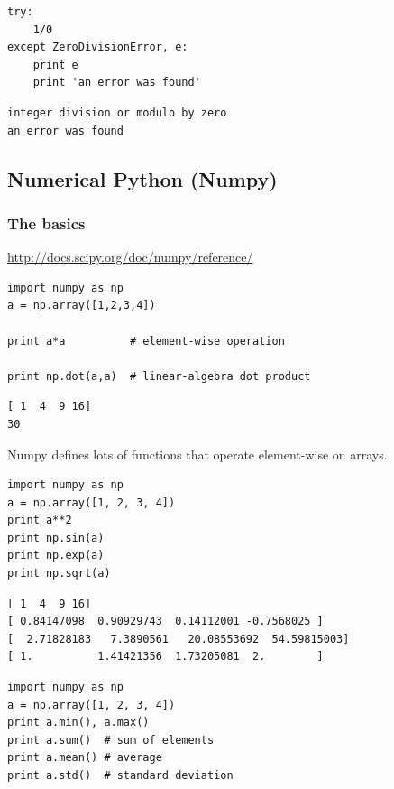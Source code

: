 \documentclass[11pt]{article}
\begin{document}
\begin{verbatim}
try:
    1/0
except ZeroDivisionError, e:
    print e
    print 'an error was found'
\end{verbatim}

\begin{verbatim}
integer division or modulo by zero
an error was found
\end{verbatim}


\subsection{Numerical Python (Numpy)}
\label{sec-3-11}

\subsubsection{The basics}
\label{sec-3-11-1}
\url{http://docs.scipy.org/doc/numpy/reference/}

\begin{verbatim}
import numpy as np
a = np.array([1,2,3,4])

print a*a          # element-wise operation

print np.dot(a,a)  # linear-algebra dot product
\end{verbatim}

\begin{verbatim}
[ 1  4  9 16]
30
\end{verbatim}

Numpy defines lots of functions that operate element-wise on arrays.

\begin{verbatim}
import numpy as np
a = np.array([1, 2, 3, 4])
print a**2
print np.sin(a)
print np.exp(a)
print np.sqrt(a)
\end{verbatim}

\begin{verbatim}
[ 1  4  9 16]
[ 0.84147098  0.90929743  0.14112001 -0.7568025 ]
[  2.71828183   7.3890561   20.08553692  54.59815003]
[ 1.          1.41421356  1.73205081  2.        ]
\end{verbatim}

\begin{verbatim}
import numpy as np
a = np.array([1, 2, 3, 4])
print a.min(), a.max()
print a.sum()  # sum of elements
print a.mean() # average
print a.std()  # standard deviation
\end{verbatim}
\end{document}
